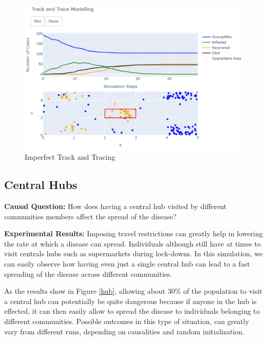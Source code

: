 \vspace{-0.4cm}
\begin{figure}[ht!]%
    \centering
    \includegraphics[width=0.85\linewidth]{latex/images/track2.pdf}
    \vspace{-0.4cm}
    \caption{Imperfect Track and Tracing}
    \label{track2}
\end{figure}
\vspace{-0.3cm}

\subsection{Central Hubs}

\textbf{Causal Question:} How does having a central hub visited by different communities members affect the spread of the disease?

\textbf{Experimental Results:} Imposing travel restrictions can greatly help in lowering the rate at which a disease can spread. Individuals although still have at times to visit centrals hubs such as supermarkets during lock-downs. In this simulation, we can easily observe how having even just a single central hub can lead to a fast spreading of the disease across different communities.

As the results show in Figure \ref{hub}, allowing about 30\% of the population to visit a central hub can potentially be quite dangerous because if anyone in the hub is effected, it can then easily allow to spread the disease to individuals belonging to different communities. Possible outcomes in this type of situation, can greatly vary from different runs, depending on causalities and random initialization.

